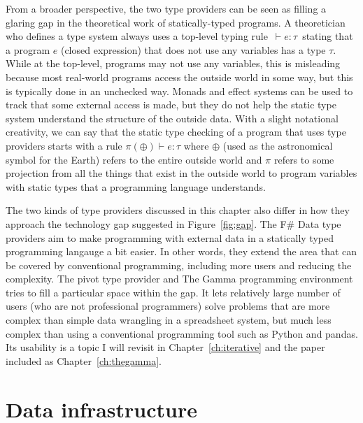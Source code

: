 \documentclass[fleqn,11pt]{report}
\theoremstyle{definition}
\begin{document}
From a broader perspective, the two type providers can be seen as filling a glaring gap in the
theoretical work of statically-typed programs. A theoretician who defines a type system always uses
a top-level typing rule \,$\vdash\!e\!:\!\tau$\, stating that a program $e$ (closed expression) that
does not use any variables has a type $\tau$. While at the top-level, programs may not use any variables,
this is misleading because most real-world programs access the outside world in some way, but
this is typically done in an unchecked way. Monads and effect systems \citep{lucassen-1988-effects,spj-1993-imperative}
can be used to track that some external access is made, but they do not help the static type
system understand the structure of the outside data.
%
With a slight notational creativity, we can say that the static type checking of a program that
uses type providers starts with a rule $\pi(\oplus) \vdash e\!:\!\tau$ where $\oplus$ (used as the
astronomical symbol for the Earth) refers to the entire outside world and $\pi$ refers
to some projection from all the things that exist in the outside world to program variables
with static types that a programming language understands.

The two kinds of type providers discussed in this chapter also differ in how they approach the
technology gap suggested in Figure~\ref{fig:gap}. The F\# Data type providers aim to make
programming with external data in a statically typed programming langauge a bit easier.
In other words, they extend the area that can be covered by conventional programming,
including more users and reducing the complexity. The pivot type provider and The Gamma
programming environment tries to fill a particular space within the gap. It lets relatively
large number of users (who are not professional programmers) solve problems that are more complex
than simple data wrangling in a spreadsheet system, but much less complex than using a conventional
programming tool such as Python and pandas. Its usability is a topic I will revisit in
Chapter~\ref{ch:iterative} and the paper included as Chapter~\ref{ch:thegamma}.


\chapter{Data infrastructure}
\end{document}
